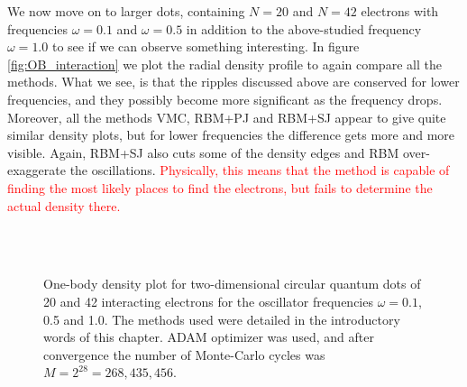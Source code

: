 We now move on to larger dots, containing $N=20$ and $N=42$ electrons with frequencies $\omega=0.1$ and $\omega=0.5$ in addition to the above-studied frequency $\omega=1.0$ to see if we can observe something interesting. In figure \eqref{fig:OB_interaction} we plot the radial density profile to again compare all the methods. What we see, is that the ripples discussed above are conserved for lower frequencies, and they possibly become more significant as the frequency drops. Moreover, all the methods VMC, RBM+PJ and RBM+SJ appear to give quite similar density plots, but for lower frequencies the difference gets more and more visible. Again, RBM+SJ also cuts some of the density edges and RBM over-exaggerate the oscillations. \textcolor{red}{Physically, this means that the method is capable of finding the most likely places to find the electrons, but fails to determine the actual density there.}

\begin{figure}
	\centering
	\captionsetup[subfigure]{labelformat=empty}
	\hspace{0.1cm}
	\hspace{-0.5cm}
	\\
	
	\hspace{0.1cm}
	\hspace{-0.5cm}
	\\
	
	\hspace{0.1cm}
	\hspace{-0.5cm}
	
	\caption{One-body density plot for two-dimensional circular quantum dots of 20 and 42 interacting electrons for the oscillator frequencies $\omega=0.1$, 0.5 and 1.0. The methods used were detailed in the introductory words of this chapter. ADAM optimizer was used, and after convergence the number of Monte-Carlo cycles was $M=2^{28}=268,435,456$.}
	\label{fig:OB_interaction}
\end{figure}

